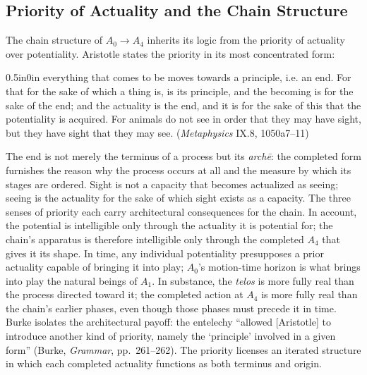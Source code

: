 \subsection{Priority of Actuality and the Chain Structure}

The chain structure of $A_0 \rightarrow A_4$ inherits its logic from the priority of actuality over potentiality. Aristotle states the priority in its most concentrated form:
\begin{adjustwidth}{0.5in}{0in}
everything that comes to be moves towards a principle, i.e. an end. For that for the sake of which a thing is, is its principle, and the becoming is for the sake of the end; and the actuality is the end, and it is for the sake of this that the potentiality is acquired. For animals do not see in order that they may have sight, but they have sight that they may see. (\textit{Metaphysics} IX.8, 1050a7--11)
\end{adjustwidth}
The end is not merely the terminus of a process but its \textit{archē}: the completed form furnishes the reason why the process occurs at all and the measure by which its stages are ordered. Sight is not a capacity that becomes actualized as seeing; seeing is the actuality for the sake of which sight exists as a capacity. The three senses of priority each carry architectural consequences for the chain. In account, the potential is intelligible only through the actuality it is potential for; the chain's apparatus is therefore intelligible only through the completed $A_4$ that gives it its shape. In time, any individual potentiality presupposes a prior actuality capable of bringing it into play; $A_0$'s motion-time horizon is what brings into play the natural beings of $A_1$. In substance, the \textit{telos} is more fully real than the process directed toward it; the completed action at $A_4$ is more fully real than the chain's earlier phases, even though those phases must precede it in time. Burke isolates the architectural payoff: the entelechy ``allowed [Aristotle] to introduce another kind of priority, namely the `principle' involved in a given form'' (Burke, \textit{Grammar}, pp.~261--262). The priority licenses an iterated structure in which each completed actuality functions as both terminus and origin.

